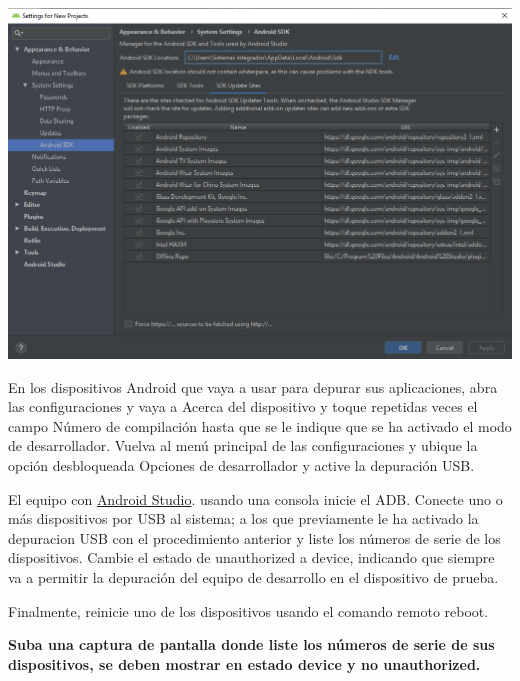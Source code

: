 \documentclass[answers]{exam}
\begin{document}
\begin{questions}
\begin{framed}
\begin{center}
    \end{center}
    \begin{center}
        \includegraphics[width=15.5cm]{img/AndroidSDK_03.png}
    \end{center}
\end{framed}


\begin{framed}
    En los dispositivos Android que vaya a usar para depurar sus aplicaciones, abra las configuraciones y vaya a Acerca del dispositivo y toque repetidas veces el campo Número de compilación hasta que se le indique que se ha activado el modo de desarrollador. Vuelva al menú principal de las configuraciones y ubique la opción desbloqueada Opciones de desarrollador y active la depuración USB.
    
    El equipo con \href{http://esie.icat.unam.mx/moodle/mod/folder/view.php?id=451}{Android Studio}. usando una consola inicie el ADB. Conecte uno o más dispositivos por USB al sistema; a los que previamente le ha activado la depuracion USB con el procedimiento anterior y liste los números de serie de los dispositivos. Cambie el estado de unauthorized a device, indicando que siempre va a permitir la depuración del equipo de desarrollo en el dispositivo de prueba.
    
    Finalmente, reinicie uno de los dispositivos usando el comando remoto reboot.
    
    \textbf{Suba una captura de pantalla donde liste los números de serie de sus dispositivos, se deben mostrar en estado device y no unauthorized.}
    

\end{framed}
\end{questions}
\end{document}
